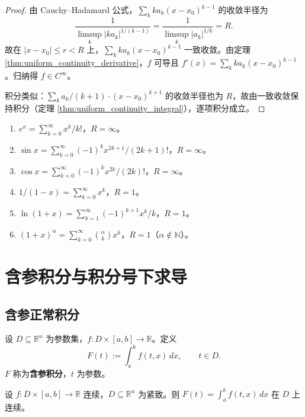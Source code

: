 \begin{proof}
由 Cauchy--Hadamard 公式，$\sum_k k a_k (x - x_0)^{k-1}$ 的收敛半径为
\[
\frac{1}{\limsup_k |k a_k|^{1/(k-1)}} = \frac{1}{\limsup_k |a_k|^{1/k}} = R.
\]
故在 $|x - x_0| \le r < R$ 上，$\sum_k k a_k (x - x_0)^{k-1}$ 一致收敛。由定理 \ref{thm:uniform_continuity_derivative}，$f$ 可导且 $f'(x) = \sum_k k a_k (x - x_0)^{k-1}$。归纳得 $f \in C^\infty$。

积分类似：$\sum_k a_k/(k+1) \cdot (x - x_0)^{k+1}$ 的收敛半径也为 $R$，故由一致收敛保持积分（定理 \ref{thm:uniform_continuity_integral}），逐项积分成立。
\end{proof}

\begin{example}[常见幂级数]\label{ex:power_series_examples}
\begin{enumerate}[label=(\roman*)]
    \item $e^x = \sum_{k=0}^{\infty} x^k / k!$，$R = \infty$。
    \item $\sin x = \sum_{k=0}^{\infty} (-1)^k x^{2k+1} / (2k+1)!$，$R = \infty$。
    \item $\cos x = \sum_{k=0}^{\infty} (-1)^k x^{2k} / (2k)!$，$R = \infty$。
    \item $1/(1-x) = \sum_{k=0}^{\infty} x^k$，$R = 1$。
    \item $\ln(1+x) = \sum_{k=1}^{\infty} (-1)^{k+1} x^k / k$，$R = 1$。
    \item $(1+x)^\alpha = \sum_{k=0}^{\infty} \binom{\alpha}{k} x^k$，$R = 1$（$\alpha \notin \mathbb{N}$）。
\end{enumerate}
\end{example}

\section{含参积分与积分号下求导}

\subsection{含参正常积分}

\begin{definition}[含参积分]\label{def:parametric_integral}
设 $D \subseteq \mathbb{R}^n$ 为参数集，$f: D \times [a, b] \to \mathbb{R}$。定义
\[
F(t) := \int_a^b f(t, x) \, dx, \qquad t \in D.
\]
$F$ 称为\textbf{含参积分}，$t$ 为参数。
\end{definition}

\begin{theorem}[含参积分的连续性]\label{thm:parametric_integral_continuity}
设 $f: D \times [a, b] \to \mathbb{R}$ 连续，$D \subseteq \mathbb{R}^n$ 为紧致。则 $F(t) = \int_a^b f(t, x) \, dx$ 在 $D$ 上连续。
\end{theorem}


